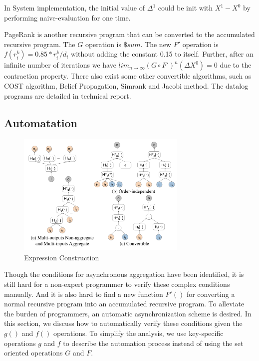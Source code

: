 In System implementation, the initial value of $\Delta^1$ could be init with $X^1-X^0$ by performing naive-evaluation for one time.

PageRank is another recursive program that can be converted to the accumulated recursive program. The $G$ operation is $\$sum$. The new $F'$ operation is $f(r_i^k)=0.85*r_i^k/d_i$ without adding the constant 0.15 to itself. Further, after an infinite number of iterations we have $lim_{n\rightarrow\infty}(G\circ F')^n(\Delta X^0)=0$ due to the contraction property. There also exist some other convertible algorithms, such as COST algorithm, Belief Propagation, Simrank and Jacobi method. The datalog programs are detailed in technical report\cite{fullversion}.





\subsection{Automatation}
\begin{figure}[!t]
	\centering
	\includegraphics[width=3.2in]{fig/automodel}
	\vspace{-0.1in}
	\caption{Expression Construction}
	\label{fig:automodel}
	\vspace{-0.1in}
\end{figure}
Though the conditions for asynchronous aggregation have been identified, it is still hard for a non-expert programmer to verify these complex conditions manually. And it is also hard to find a new function $F'()$ for converting a normal recursive program into an accumulated recursive program.
 To alleviate the burden of programmers, an automatic asynchronization scheme is desired. In this section, we discuss how to automatically verify these conditions given the $g()$ and $f()$ operations. To simplify the analysis, we use key-specific operations $g$ and $f$ to describe the automation process instead of using the set oriented operations $G$ and $F$.
 
